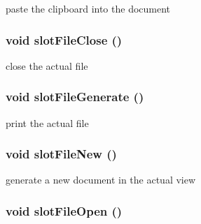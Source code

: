 paste the clipboard into the document \hypertarget{class_bxbuilder_app_1a024140268e7d0346f28cc3c569f3ca}{
\subsubsection[{slotFileClose}]{\setlength{\rightskip}{0pt plus 5cm}void slotFileClose ()}}
\label{class_bxbuilder_app_1a024140268e7d0346f28cc3c569f3ca}


close the actual file \hypertarget{class_bxbuilder_app_2c67ccee0bb45d54f27d059fd9136d64}{
\subsubsection[{slotFileGenerate}]{\setlength{\rightskip}{0pt plus 5cm}void slotFileGenerate ()}}
\label{class_bxbuilder_app_2c67ccee0bb45d54f27d059fd9136d64}


print the actual file \hypertarget{class_bxbuilder_app_0f2e6b7987ce423edbe0a260233353d3}{
\subsubsection[{slotFileNew}]{\setlength{\rightskip}{0pt plus 5cm}void slotFileNew ()}}
\label{class_bxbuilder_app_0f2e6b7987ce423edbe0a260233353d3}


generate a new document in the actual view \hypertarget{class_bxbuilder_app_71cdb85b5c6a99f6d2f6a6bd98811f20}{
\subsubsection[{slotFileOpen}]{\setlength{\rightskip}{0pt plus 5cm}void slotFileOpen ()}}
\label{class_bxbuilder_app_71cdb85b5c6a99f6d2f6a6bd98811f20}


